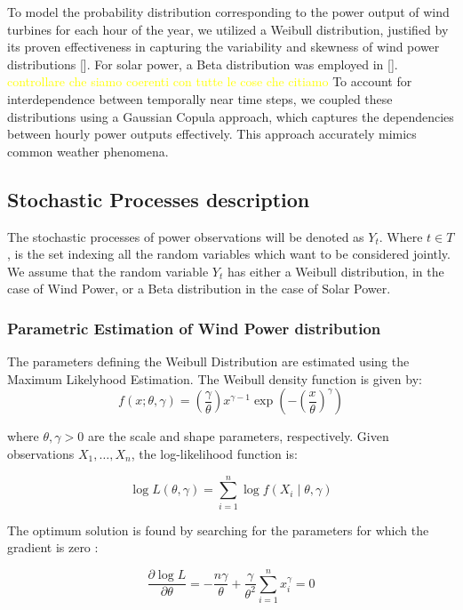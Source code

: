\documentclass[english]{article}
\numberwithin{definition}{section}
\numberwithin{theorem}{section}
\numberwithin{problem}{section}
\begin{document}
To model the probability distribution corresponding to the power output of wind turbines for each hour of the year, we utilized a Weibull distribution, justified by its proven effectiveness in capturing the variability and skewness of wind power distributions [\cite{weibullwind}]. For solar power, a Beta distribution was employed in [\cite{betaPV}]. \textcolor{yellow}{controllare che siamo coerenti con tutte le cose che citiamo} To account for interdependence between temporally near time steps, we coupled these distributions using a Gaussian Copula approach, which captures the dependencies between hourly power outputs effectively. This approach accurately mimics common weather phenomena. \\

\subsection{Stochastic Processes description}
The stochastic processes of power observations will be denoted as \(Y_t\). Where \(t \in T\), is the set indexing all the random variables which want to be considered jointly.
We assume that the random variable \(Y_t\) has either a Weibull distribution, in the case of Wind Power, or a Beta distribution in the case of Solar Power. 

\subsubsection{Parametric Estimation of Wind Power distribution}
\label{subsection: weib estim}
The parameters defining the Weibull Distribution are estimated using the Maximum Likelyhood Estimation. The Weibull density function is given by:
\[
f(x; \theta, \gamma) = \left(\frac{\gamma}{\theta}\right)x^{\gamma-1}\exp\left(-\left(\frac{x}{\theta}\right)^\gamma\right)
\]

where \(\theta, \gamma > 0\) are the scale and shape parameters, respectively. Given observations \(X_1, \ldots, X_n\), the log-likelihood function is:

\[
\log L(\theta, \gamma) = \sum_{i=1}^n \log f(X_i \mid \theta, \gamma)
\]

The optimum solution is found by searching for the parameters for which the gradient is zero :

\begin{equation}
\frac{\partial \log L}{\partial \theta} = -\frac{n \gamma}{\theta} + \frac{\gamma}{\theta^2} \sum_{i=1}^{n} x_i^\gamma = 0
\end{equation}
\end{document}
